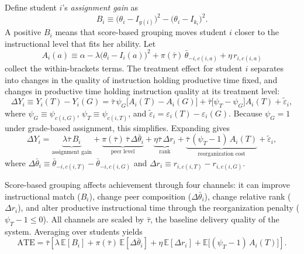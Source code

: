 \documentclass[11pt]{article}
\newcommand{\E}{\mathbb{E}}
\begin{document}
Define student $i$'s \emph{assignment gain} as
\begin{equation}
\label{eq:Bi}
B_i \equiv \big(\theta_i - I_{g(i)}\big)^2 - \big(\theta_i - I_{k_i}\big)^2.
\end{equation}
A positive $B_i$ means that score-based grouping moves student $i$ closer to the instructional level that fits her ability. Let
\begin{equation}
A_i(a) \equiv \alpha - \lambda\big(\theta_i - I_i(a)\big)^2 + \pi(\bar{\tau})\,\bar{\theta}_{-i,c(i,a)} + \eta\, r_{i,c(i,a)}
\end{equation}
collect the within-brackets terms. The treatment effect for student $i$ separates into changes in the quality of instruction holding productive time fixed, and changes in productive time holding instruction quality at its treatment level:
\begin{equation}
\label{eq:decomp}
\Delta Y_i \equiv Y_i(T) - Y_i(G) = \bar{\tau}\,\psi_{G}\big[A_i(T) - A_i(G)\big] + \bar{\tau}\big[\psi_{T} - \psi_{G}\big] A_i(T) + \tilde{\varepsilon}_i,
\end{equation}
where $\psi_G \equiv \psi_{c(i,G)}$, $\psi_T \equiv \psi_{c(i,T)}$, and $\tilde{\varepsilon}_i = \varepsilon_i(T) - \varepsilon_i(G)$. Because $\psi_G = 1$ under grade-based assignment, this simplifies. Expanding gives
\begin{equation}
\label{eq:decomp_full}
\Delta Y_i = \underbrace{\lambda\bar{\tau}\, B_i}_{\text{assignment gain}} + \underbrace{\pi(\bar{\tau})\,\bar{\tau}\,\Delta\bar{\theta}_i}_{\text{peer level}} + \underbrace{\eta\bar{\tau}\,\Delta r_i}_{\text{rank}} + \underbrace{\bar{\tau}\,(\psi_T - 1)\, A_i(T)}_{\text{reorganization cost}} + \tilde{\varepsilon}_i,
\end{equation}
where $\Delta\bar{\theta}_i \equiv \bar{\theta}_{-i,c(i,T)} - \bar{\theta}_{-i,c(i,G)}$ and $\Delta r_i \equiv r_{i,c(i,T)} - r_{i,c(i,G)}$.

Score-based grouping affects achievement through four channels: it can improve instructional match ($B_i$), change peer composition ($\Delta\bar{\theta}_i$), change relative rank ($\Delta r_i$), and alter productive instructional time through the reorganization penalty ($\psi_T - 1 \leq 0$). All channels are scaled by $\bar{\tau}$, the baseline delivery quality of the system. Averaging over students yields
\begin{equation}
\label{eq:ate}
\text{ATE} = \bar{\tau}\left[\lambda\,\E[B_i] + \pi(\bar{\tau})\,\E[\Delta\bar{\theta}_i] + \eta\,\E[\Delta r_i] + \E\!\big[(\psi_T - 1)\, A_i(T)\big]\right].
\end{equation}
\end{document}
